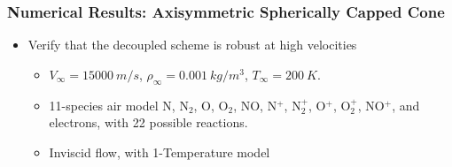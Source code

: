 \documentclass{beamer}
\begin{document}
\begin{frame}
  \frametitle{Numerical Results: Axisymmetric Spherically Capped Cone}
  \begin{figure}[h]
  	\centering
  \end{figure}
  \begin{itemize}
    \item Verify that the decoupled scheme is robust at high velocities
    \begin{itemize}
      \item $V_{\infty} = 15000\ m/s$, $\rho_{\infty}=0.001\ kg/m^3$, 
        $T_\infty = 200\ K$.
      \item 11-species air model N, $\text{N}_2$, O,
        $\text{O}_2$, NO, N$^+$, $\text{N}_2^+$, O$^+$, 
        $\text{O}_2^+$, NO$^+$, and electrons, with 22 possible reactions.
      \item Inviscid flow, with 1-Temperature model
    \end{itemize}
  \end{itemize}
\end{frame}
\end{document}
